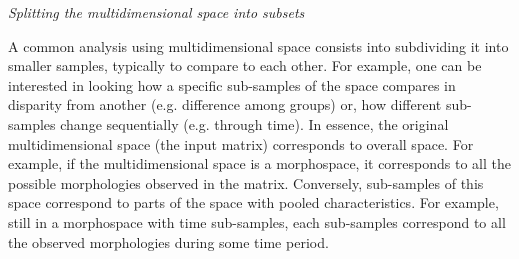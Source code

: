 \documentclass[12pt,letterpaper]{article}
\renewcommand{\subsection}[1]{%
\bigskip
\begin{center}
\begin{large}
\normalfont\itshape #1
\end{large}
\end{center}}
\begin{document}





\subsection{Splitting the multidimensional space into subsets}
A common analysis using multidimensional space consists into subdividing it into smaller samples, typically to compare to each other.
For example, one can be interested in looking how a specific sub-samples of the space compares in disparity from another (e.g. difference among groups) or, how different sub-samples change sequentially (e.g. through time).
In essence, the original multidimensional space (the input matrix) corresponds to overall space.
For example, if the multidimensional space is a morphospace, it corresponds to all the possible morphologies observed in the matrix.
Conversely, sub-samples of this space correspond to parts of the space with pooled characteristics.
For example, still in a morphospace with time sub-samples, each sub-samples correspond to all the observed morphologies during some time period.
\end{document}
